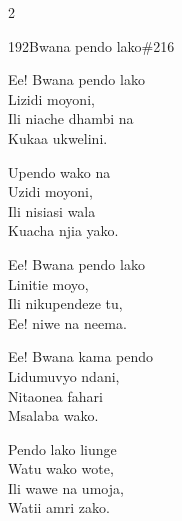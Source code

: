 \documentclass{article}
\begin{document}
\begin{multicols}{2}
\begin{hymn}{192}{Bwana pendo lako}{\#216}
\begin{stanza}
Ee! Bwana pendo lako\\
Lizidi moyoni,\\
Ili niache dhambi na\\
Kukaa ukwelini.
\end{stanza}
\begin{chorus}
Upendo wako na\\
Uzidi moyoni,\\
Ili nisiasi wala\\
Kuacha njia yako.
\end{chorus}
\begin{stanza}
Ee! Bwana pendo lako\\
Linitie moyo,\\
Ili nikupendeze tu,\\
Ee! niwe na neema.
\end{stanza}
\begin{stanza}
Ee! Bwana kama pendo\\
Lidumuvyo ndani,\\
Nitaonea fahari\\
Msalaba wako.
\end{stanza}
\begin{stanza}
Pendo lako liunge\\
Watu wako wote,\\
Ili wawe na umoja,\\
Watii amri zako.
\end{stanza}
\end{hymn}


\end{multicols}
\end{document}
